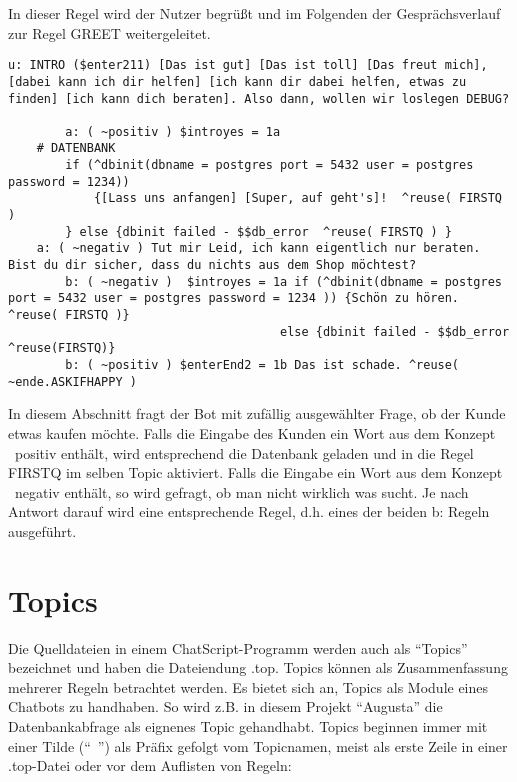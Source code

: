 In dieser Regel wird der Nutzer begrüßt und im Folgenden der Gesprächsverlauf zur Regel GREET weitergeleitet.

\begin{lstlisting}[caption={Beispiel für Gesprächsablauf mit Antworten u:, a: und b:}]
 u: INTRO ($enter211) [Das ist gut] [Das ist toll] [Das freut mich], [dabei kann ich dir helfen] [ich kann dir dabei helfen, etwas zu finden] [ich kann dich beraten]. Also dann, wollen wir loslegen DEBUG?

		a: ( ~positiv ) $introyes = 1a
	# DATENBANK
	    if (^dbinit(dbname = postgres port = 5432 user = postgres password = 1234))
	        {[Lass uns anfangen] [Super, auf geht's]!  ^reuse( FIRSTQ )
	    } else {dbinit failed - $$db_error  ^reuse( FIRSTQ ) }
	a: ( ~negativ ) Tut mir Leid, ich kann eigentlich nur beraten. Bist du dir sicher, dass du nichts aus dem Shop möchtest?
		b: ( ~negativ )  $introyes = 1a if (^dbinit(dbname = postgres port = 5432 user = postgres password = 1234 )) {Schön zu hören. ^reuse( FIRSTQ )}
                                      else {dbinit failed - $$db_error ^reuse(FIRSTQ)}
	    b: ( ~positiv ) $enterEnd2 = 1b Das ist schade. ^reuse( ~ende.ASKIFHAPPY )
\end{lstlisting}

In diesem Abschnitt fragt der Bot mit zufällig ausgewählter Frage, ob der Kunde etwas kaufen möchte. Falls die Eingabe des Kunden ein Wort aus dem Konzept ~positiv enthält, wird entsprechend die Datenbank geladen und in die Regel FIRSTQ im selben Topic aktiviert. Falls die Eingabe ein Wort aus dem Konzept ~negativ enthält, so wird gefragt, ob man nicht wirklich was sucht. Je nach Antwort darauf wird eine entsprechende Regel, d.h. eines der beiden b: Regeln ausgeführt. 


\section{Topics}
\label{sec:ChatScript: Topics}

Die Quelldateien in einem ChatScript-Programm werden auch als "`Topics"' bezeichnet und haben die Dateiendung .top. Topics können als Zusammenfassung mehrerer Regeln betrachtet werden. Es bietet sich an, Topics als Module eines Chatbots zu handhaben. So wird z.B. in diesem Projekt "`Augusta"' die Datenbankabfrage als eignenes Topic gehandhabt.
Topics beginnen immer mit einer Tilde ("`~"') als Präfix gefolgt vom Topicnamen, meist als erste Zeile in einer .top-Datei oder vor dem Auflisten von Regeln:

